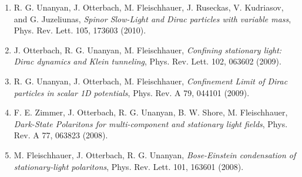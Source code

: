 \documentclass[10pt,centered]{./res} %
\begin{document}
\begin{resume}
\begin{enumerate}
  \item R. G. Unanyan, J. Otterbach, M. Fleischhauer, J. Ruseckas, V. Kudriasov, and G. Juzeliunas, \textit{Spinor Slow-Light and Dirac particles with variable mass}, Phys. Rev. Lett. 105, 173603 (2010).
  
  \item J. Otterbach, R. G. Unanyan, M. Fleischhauer, \textit{Confining stationary light: Dirac dynamics and Klein tunneling}, Phys. Rev. Lett. 102, 063602 (2009).
  
  \item R. G. Unanyan, J. Otterbach, M. Fleischhauer, \textit{Confinement Limit of Dirac particles in scalar 1D potentials}, Phys. Rev. A 79, 044101 (2009).
  
  \item F. E. Zimmer, J. Otterbach, R. G. Unanyan, B. W. Shore, M. Fleischhauer, \textit{Dark-State Polaritons for multi-component and stationary light fields}, Phys. Rev. A 77, 063823 (2008).
  
  \item M. Fleischhauer, J. Otterbach, R. G. Unanyan, \textit{Bose-Einstein condensation of stationary-light polaritons}, Phys. Rev. Lett. 101, 163601 (2008).

\end{enumerate}




\end{resume}
\end{document}

